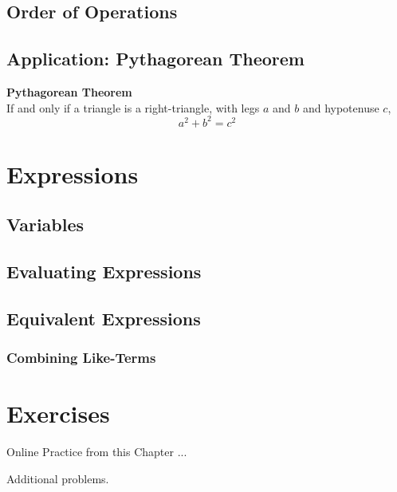 \newpage 
\subsection{Order of Operations}


\newpage 
\subsection{Application: Pythagorean Theorem} 

\begin{theorem} \textbf{Pythagorean Theorem} \\ 
If and only if a triangle is a right-triangle, with legs \(a\) and \(b\) and hypotenuse \(c\),
\[a^2 + b^2 = c^2\]
\end{theorem}



\newpage 
\section{Expressions}

\subsection{Variables}
\subsection{Evaluating Expressions}
\subsection{Equivalent Expressions}
\subsubsection{Combining Like-Terms}

\newpage 
\section{Exercises} 

Online Practice from this Chapter ... 

Additional problems. 















